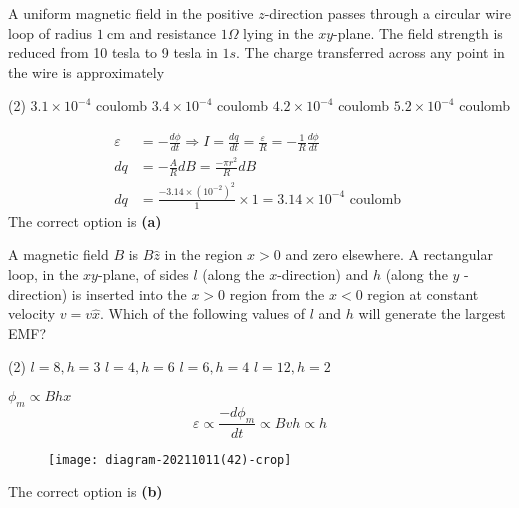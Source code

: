 \begin{enumerate}
\begin{minipage}{\textwidth}
	\item A uniform magnetic field in the positive $z$-direction passes through a circular wire loop of radius $1 \mathrm{~cm}$ and resistance $1 \Omega$ lying in the $x y$-plane. The field strength is reduced from 10 tesla to 9 tesla in $1 s$. The charge transferred across any point in the wire is approximately
\end{minipage}
\begin{tasks}(2)
	\task[\textbf{A.}]$3.1 \times 10^{-4}$ coulomb
	\task[\textbf{B.}] $3.4 \times 10^{-4}$ coulomb
	\task[\textbf{C.}] $4.2 \times 10^{-4}$ coulomb
	\task[\textbf{D.}]$5.2 \times 10^{-4}$ coulomb
\end{tasks}
\begin{answer}	
 \begin{align*}
 \varepsilon&=-\frac{d \phi}{d t} \Rightarrow I=\frac{d q}{d t}=\frac{\varepsilon}{R}=-\frac{1}{R} \frac{d \phi}{d t} \\
 d q&=-\frac{A}{R} d B=\frac{-\pi r^{2}}{R} d B \\
 d q&=\frac{-3.14 \times\left(10^{-2}\right)^{2}}{1} \times 1=3.14 \times 10^{-4} \text { coulomb }
 \end{align*}	
	The correct option is \textbf{(a)}	
\end{answer}
\begin{minipage}{\textwidth}
	\item A magnetic field $B$ is $B \hat{z}$ in the region $x>0$ and zero elsewhere. A rectangular loop, in the $x y$-plane, of sides $l$ (along the $x$-direction) and $h$ (along the $y$ - direction) is inserted into the $x>0$ region from the $x<0$ region at constant velocity $v=v \hat{x}$. Which of the following values of $l$ and $h$ will generate the largest EMF?
\end{minipage}
\begin{tasks}(2)
	\task[\textbf{A.}] $l=8, h=3$
	\task[\textbf{B.}]$l=4, h=6$
	\task[\textbf{C.}]$l=6, h=4$
	\task[\textbf{D.}]$l=12, h=2$
\end{tasks}
\begin{answer}
	$\phi_{m} \propto B h x$
	$$
	\varepsilon \propto \frac{-d \phi_{m}}{d t} \propto B v h \propto h
	$$
	\begin{figure}[H]
		\centering
		\texttt{[image: diagram-20211011(42)-crop]}
	\end{figure}
	The correct option is \textbf{(b)}	
\end{answer}
\end{enumerate}